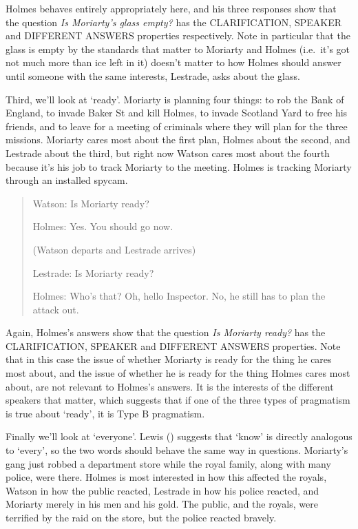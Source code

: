 \documentclass[
  11pt,
  letterpaper,
  DIV=11,
  numbers=noendperiod,
  twoside]{scrartcl}
\begin{document}
Holmes behaves entirely appropriately here, and his three responses show
that the question \emph{Is Moriarty's glass empty?} has the
CLARIFICATION, SPEAKER and DIFFERENT ANSWERS properties respectively.
Note in particular that the glass is empty by the standards that matter
to Moriarty and Holmes (i.e.~it's got not much more than ice left in it)
doesn't matter to how Holmes should answer until someone with the same
interests, Lestrade, asks about the glass.

Third, we'll look at `ready'. Moriarty is planning four things: to rob
the Bank of England, to invade Baker St and kill Holmes, to invade
Scotland Yard to free his friends, and to leave for a meeting of
criminals where they will plan for the three missions. Moriarty cares
most about the first plan, Holmes about the second, and Lestrade about
the third, but right now Watson cares most about the fourth because it's
his job to track Moriarty to the meeting. Holmes is tracking Moriarty
through an installed spycam.

\begin{quote}
Watson: Is Moriarty ready?

Holmes: Yes. You should go now.

(Watson departs and Lestrade arrives)

Lestrade: Is Moriarty ready?

Holmes: Who's that? Oh, hello Inspector. No, he still has to plan the
attack out.
\end{quote}

Again, Holmes's answers show that the question \emph{Is Moriarty ready?}
has the CLARIFICATION, SPEAKER and DIFFERENT ANSWERS properties. Note
that in this case the issue of whether Moriarty is ready for the thing
he cares most about, and the issue of whether he is ready for the thing
Holmes cares most about, are not relevant to Holmes's answers. It is the
interests of the different speakers that matter, which suggests that if
one of the three types of pragmatism is true about `ready', it is Type B
pragmatism.

Finally we'll look at `everyone'. Lewis
() suggests that `know' is directly
analogous to `every', so the two words should behave the same way in
questions. Moriarty's gang just robbed a department store while the
royal family, along with many police, were there. Holmes is most
interested in how this affected the royals, Watson in how the public
reacted, Lestrade in how his police reacted, and Moriarty merely in his
men and his gold. The public, and the royals, were terrified by the raid
on the store, but the police reacted bravely.
\end{document}
